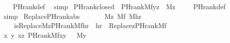 \begin{isabellebody}
%
\isadelimproof
\ \ %
\endisadelimproof
%
\isatagproof
{}\isamarkupfalse%
\ PHrank{\isacharunderscore}{\kern0pt}def\ \isamarkupfalse%
\ simp%
\endisatagproof
{\isafoldproof}%
%
\isadelimproof
\isanewline
%
\endisadelimproof
\isanewline
{}\isamarkupfalse%
\ PHrank{\isacharunderscore}{\kern0pt}closed\ {\isacharcolon}{\kern0pt}\ {\isachardoublequoteopen}PHrank{\isacharparenleft}{\kern0pt}M{\isacharcomma}{\kern0pt}f{\isacharcomma}{\kern0pt}y{\isacharcomma}{\kern0pt}z{\isacharparenright}{\kern0pt}\ {\isasymLongrightarrow}\ M{\isacharparenleft}{\kern0pt}z{\isacharparenright}{\kern0pt}{\isachardoublequoteclose}\ \isanewline
%
\isadelimproof
\ \ %
\endisadelimproof
%
\isatagproof
{}\isamarkupfalse%
\ PHrank{\isacharunderscore}{\kern0pt}def\ \isamarkupfalse%
\ simp%
\endisatagproof
{\isafoldproof}%
%
\isadelimproof
\isanewline
%
\endisadelimproof
\isanewline
{}\isamarkupfalse%
\ Replace{\isacharunderscore}{\kern0pt}PHrank{\isacharunderscore}{\kern0pt}abs{\isacharcolon}{\kern0pt}\isanewline
\ \ \isanewline
\ \ \ \ {\isachardoublequoteopen}M{\isacharparenleft}{\kern0pt}z{\isacharparenright}{\kern0pt}{\isachardoublequoteclose}\ {\isachardoublequoteopen}M{\isacharparenleft}{\kern0pt}f{\isacharparenright}{\kern0pt}{\isachardoublequoteclose}\ {\isachardoublequoteopen}M{\isacharparenleft}{\kern0pt}hr{\isacharparenright}{\kern0pt}{\isachardoublequoteclose}\ \isanewline
\ \ \isanewline
\ \ \ \ {\isachardoublequoteopen}is{\isacharunderscore}{\kern0pt}Replace{\isacharparenleft}{\kern0pt}M{\isacharcomma}{\kern0pt}z{\isacharcomma}{\kern0pt}PHrank{\isacharparenleft}{\kern0pt}M{\isacharcomma}{\kern0pt}f{\isacharparenright}{\kern0pt}{\isacharcomma}{\kern0pt}hr{\isacharparenright}{\kern0pt}\ {\isasymlongleftrightarrow}\ hr\ {\isacharequal}{\kern0pt}\ Replace{\isacharparenleft}{\kern0pt}z{\isacharcomma}{\kern0pt}PHrank{\isacharparenleft}{\kern0pt}M{\isacharcomma}{\kern0pt}f{\isacharparenright}{\kern0pt}{\isacharparenright}{\kern0pt}{\isachardoublequoteclose}\ \isanewline
%
\isadelimproof
%
\endisadelimproof
%
\isatagproof
{}\isamarkupfalse%
\ {\isacharminus}{\kern0pt}\isanewline
\ \ \isamarkupfalse%
\ {\isachardoublequoteopen}{\isasymAnd}x\ y{\isachardot}{\kern0pt}\ {\isasymlbrakk}x{\isasymin}z{\isacharsemicolon}{\kern0pt}\ PHrank{\isacharparenleft}{\kern0pt}M{\isacharcomma}{\kern0pt}f{\isacharcomma}{\kern0pt}x{\isacharcomma}{\kern0pt}y{\isacharparenright}{\kern0pt}\ {\isasymrbrakk}\ {\isasymLongrightarrow}\ M{\isacharparenleft}{\kern0pt}y{\isacharparenright}{\kern0pt}{\isachardoublequoteclose}\isanewline

\end{isabellebody}
